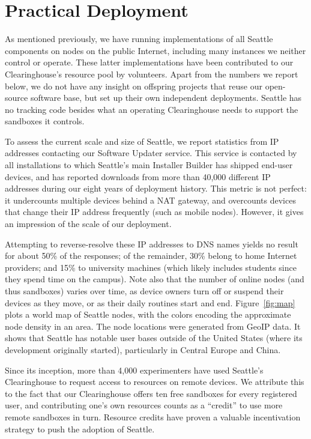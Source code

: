 \section{Practical Deployment}\label{sec-deployment}

As mentioned previously, we have running implementations of all
Seattle components on nodes on the public Internet, including
many instances we neither control or operate. These latter
implementations have been contributed to our Clearinghouse's
resource pool by volunteers.
Apart from the numbers we report below, we do not have any
insight on offspring projects that reuse our open-source software
base, but set up their own independent deployments. Seattle has
no tracking code besides what an operating Clearinghouse
needs to support the sandboxes it controls.

To assess the current scale and size of Seattle, we report
statistics from \gls{IP} addresses contacting our Software
Updater service. This service is contacted
by all installations to which Seattle's main Installer Builder
has shipped end-user devices, and has reported downloads from more
than 40,000 different \gls{IP} addresses during our eight years
of deployment history.
This metric is not perfect: it undercounts multiple devices behind
a \gls{NAT} gateway, and overcounts devices that change their
\gls{IP} address frequently (such as mobile nodes). However, it
gives an impression of the scale of our deployment.

Attempting to reverse-resolve these \gls{IP} addresses to \gls{DNS}
names yields no result for about 50\% of the responses; of the
remainder, 30\% belong to home Internet providers; and 15\% to
university machines (which likely includes students since they
spend time on the campus). Note also that the number of online
nodes (and thus sandboxes) varies over time, as device owners
turn off or suspend their devices as they move, or as their daily
routines start and end.
Figure~\ref{fig:map} plots a world map of Seattle nodes, with the
colors encoding the approximate node density in an area.
The node locations were generated from GeoIP data.
It shows that Seattle has notable user bases outside of the
United States (where its development originally started),
particularly in Central Europe and China.

Since its inception,
more than 4,000 experimenters have used Seattle's Clearinghouse
to request access to resources on remote devices. We attribute this
to the fact that our Clearinghouse offers ten free sandboxes for
every registered user, and contributing one's own resources counts
as a ``credit'' to use more remote sandboxes in turn.
Resource credits have proven a valuable incentivation strategy
to push the adoption of Seattle.

